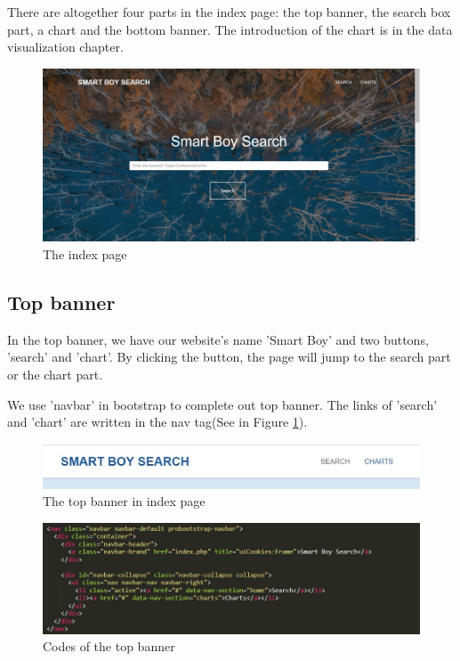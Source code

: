 \documentclass{book}
\begin{document}
There are altogether four parts in the index page: the top banner, the search box part, a chart and the bottom banner. The introduction of the chart is in the data visualization chapter.

\begin{figure}[H]
\centering
\includegraphics[scale=0.4]{img/fsh_index.jpg}
\caption{The index page}
\end{figure}

\subsection {Top banner}

In the top banner, we have our website's name 'Smart Boy' and two buttons, 'search' and 'chart'. By clicking the button, the page will jump to the search part or the chart part.


We use 'navbar' in bootstrap to complete out top banner. The links of 'search' and 'chart' are written in the nav tag(See in Figure \ref{fsh code 1}).

\begin{figure}[H]
\centering
\includegraphics[scale=0.6]{img/fsh_index_tp.jpg}
\caption{The top banner in index page}
\end{figure}


\begin{figure}[H]
\centering
\includegraphics[scale=0.6]{img/fsh_index_code_1.jpg}
\caption{Codes of the top banner}
\label{fsh code 1}
\end{figure}
\end{document}
